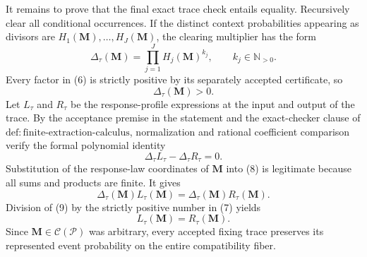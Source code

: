 It remains to prove that the final exact trace check entails equality.  Recursively clear all conditional occurrences.  If the distinct context probabilities appearing as divisors are \(H_1(\mathbf M),\ldots,H_J(\mathbf M)\), the clearing multiplier has the form
\[
 \Delta_\tau(\mathbf M)
 =\prod_{j=1}^{J}H_j(\mathbf M)^{k_j},
 \qquad k_j\in\mathbb N_{>0}.
\tag{6}
\]
Every factor in (6) is strictly positive by its separately accepted certificate, so
\[
 \Delta_\tau(\mathbf M)>0.
\tag{7}
\]
Let \(L_\tau\) and \(R_\tau\) be the response-profile expressions at the input and output of the trace.  By the acceptance premise in the statement and the exact-checker clause of \(\mathrm{def:finite\text{-}extraction\text{-}calculus}\), normalization and rational coefficient comparison verify the formal polynomial identity
\[
 \Delta_\tau L_\tau-\Delta_\tau R_\tau=0.
\tag{8}
\]
Substitution of the response-law coordinates of \(\mathbf M\) into (8) is legitimate because all sums and products are finite.  It gives
\[
 \Delta_\tau(\mathbf M)L_\tau(\mathbf M)
 =\Delta_\tau(\mathbf M)R_\tau(\mathbf M).
\tag{9}
\]
Division of (9) by the strictly positive number in (7) yields
\[
 L_\tau(\mathbf M)=R_\tau(\mathbf M).
\]
Since \(\mathbf M\in\mathcal C(\mathcal P)\) was arbitrary, every accepted fixing trace preserves its represented event probability on the entire compatibility fiber.